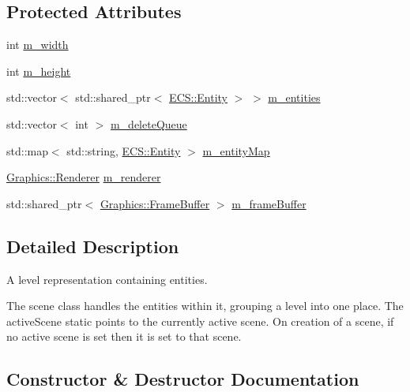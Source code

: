 \subsection*{Protected Attributes}
\begin{DoxyCompactItemize}
\item 
int \hyperlink{class_cookie_eng_1_1_scene_1_1_scene_a1990da3f0d067d2b542aa6b8fc6f0d43}{m\+\_\+width}
\item 
int \hyperlink{class_cookie_eng_1_1_scene_1_1_scene_aea87f5d089b50a248e01ae281441edd3}{m\+\_\+height}
\item 
std\+::vector$<$ std\+::shared\+\_\+ptr$<$ \hyperlink{class_cookie_eng_1_1_e_c_s_1_1_entity}{E\+C\+S\+::\+Entity} $>$ $>$ \hyperlink{class_cookie_eng_1_1_scene_1_1_scene_ad27cdfdb082498a7b812e054d4b28cb9}{m\+\_\+entities}
\item 
std\+::vector$<$ int $>$ \hyperlink{class_cookie_eng_1_1_scene_1_1_scene_a57af2369c4079df376fa6137b6249eaf}{m\+\_\+delete\+Queue}
\item 
std\+::map$<$ std\+::string, \hyperlink{class_cookie_eng_1_1_e_c_s_1_1_entity}{E\+C\+S\+::\+Entity} $>$ \hyperlink{class_cookie_eng_1_1_scene_1_1_scene_a3ded68c1652ffebf8a4827c6313ccae0}{m\+\_\+entity\+Map}
\item 
\hyperlink{class_cookie_eng_1_1_graphics_1_1_renderer}{Graphics\+::\+Renderer} \hyperlink{class_cookie_eng_1_1_scene_1_1_scene_aff47a056f32060d1180ae9bd379e9578}{m\+\_\+renderer}
\item 
std\+::shared\+\_\+ptr$<$ \hyperlink{class_cookie_eng_1_1_graphics_1_1_frame_buffer}{Graphics\+::\+Frame\+Buffer} $>$ \hyperlink{class_cookie_eng_1_1_scene_1_1_scene_a44b75b86a2f7ae2ce4dc05c20255e29e}{m\+\_\+frame\+Buffer}
\end{DoxyCompactItemize}


\subsection{Detailed Description}
A level representation containing entities. 

The scene class handles the entities within it, grouping a level into one place. The active\+Scene static points to the currently active scene. On creation of a scene, if no active scene is set then it is set to that scene. 

\subsection{Constructor \& Destructor Documentation}
\mbox{\label{class_cookie_eng_1_1_scene_1_1_scene_a957b1da74150da2df341c1ff7ed39613}} 
